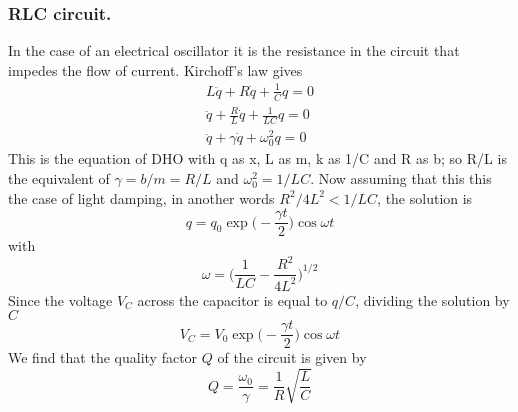 \documentclass[../main.tex]{subfiles}
\begin{document}
\subsubsection*{RLC circuit.} In the case of an electrical oscillator it is the resistance in the circuit that impedes the flow of current. Kirchoff's law gives
\begin{align*}
    L\ddot{q}+R\dot{q}+\frac{1}{C}q=0\\
    \ddot{q}+\frac{R}{L}\dot{q}+\frac{1}{LC}q=0\\
    \ddot{q}+\gamma\dot{q}+\omega_0^2q=0
\end{align*}    
This is the equation of DHO with q as x, L as m, k as 1/C and R as b; so R/L is the equivalent of $\gamma=b/m=R/L$ and $\omega_0^2=1/LC$. Now assuming that this this the case of light damping, in another words $ R^2/4L^2<1/LC$, the solution is
\begin{equation*}
    q=q_0\exp\biggl(-\frac{\gamma t}{2}\biggr)\cos\omega t
\end{equation*} 
with\begin{equation*}
    \omega =\biggl(\frac{1}{LC}-\frac{R^2}{4L^2}\biggr)^{1/2}
\end{equation*}Since the voltage $V_C$ across the capacitor is equal to $q/C$, dividing the solution by $C$\begin{equation*}
    V_C=V_0\exp\biggl(-\frac{\gamma t}{2}\biggr)\cos\omega t
\end{equation*}
We find that the quality factor $Q$ of the circuit is given by
\begin{equation*}
    Q=\frac{\omega_0}{\gamma}=  \frac{1}{R}\sqrt{\frac{L}{C}}
\end{equation*}
\end{document}

